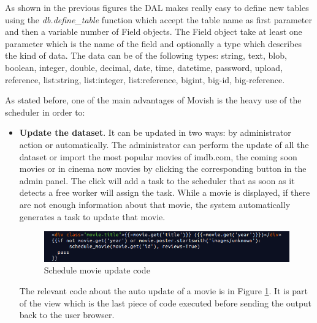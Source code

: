 As shown in the previous figures the \ac{DAL} makes really easy to define new tables using the \textit{db.define\_table} function which accept the table name as first parameter and then a variable number of Field objects. The Field object take at least one parameter which is the name of the field and optionally a type which describes the kind of data. The data can be of the following types: string, text, blob, boolean, integer, double, decimal, date, time, datetime, password, upload, reference, list:string, list:integer, list:reference, bigint, big-id, big-reference.

As stated before, one of the main advantages of Movish is the heavy use of the scheduler in order to:

\begin{itemize}
\item \textbf{Update the dataset}. It can be updated in two ways: by administrator action or automatically. The administrator can perform the update of all the dataset or import the most popular movies of imdb.com, the coming soon movies or in cinema now movies by clicking the corresponding button in the admin panel. The click will add a task to the scheduler that as soon as it detects a free worker will assign the task. While a movie is displayed, if there are not enough information about that movie, the system automatically generates a task to update that movie. 
  \begin{figure}
    \centering
    \includegraphics[width=\textwidth]{figures/schedule_autoupdate.png}
    \caption{Schedule movie update code}
    \label{fig:schedule_update}
  \end{figure}

The relevant code about the auto update of a movie is in Figure \ref{fig:schedule_update}. It is part of the view which is the last piece of code executed before sending the output back to the user browser. 


\end{itemize}
